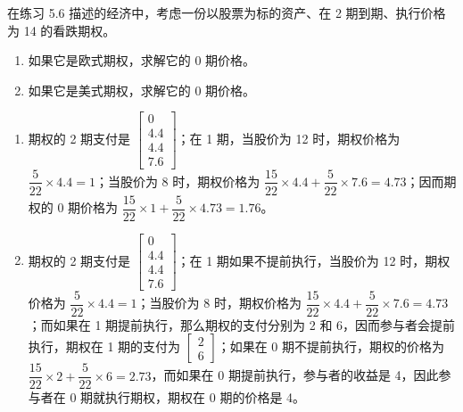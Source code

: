 \begin{problem}
 在练习 5.6 描述的经济中，考虑一份以股票为标的资产、在 2 期到期、执行价格为 14 的看跌期权。
\begin{enumerate}[label=(\alph*)]
    \item 如果它是欧式期权，求解它的 0 期价格。
    \item 如果它是美式期权，求解它的 0 期价格。
\end{enumerate}
\end{problem}
\begin{solution}
\begin{enumerate}[label=(\alph*)]
    \item 期权的 2 期支付是 $\begin{bmatrix}0\\4.4\\4.4\\7.6\end{bmatrix}$；在 1 期，当股价为 12 时，期权价格为 $\dfrac{5}{22}\times 4.4=1$；当股价为 8 时，期权价格为 $\dfrac{15}{22}\times 4.4+\dfrac{5}{22}\times 7.6=4.73$；因而期权的 0 期价格为 $\dfrac{15}{22}\times 1+\dfrac{5}{22}\times 4.73=1.76$。
    \item 期权的 2 期支付是 $\begin{bmatrix}0\\4.4\\4.4\\7.6\end{bmatrix}$；在 1 期如果不提前执行，当股价为 12 时，期权价格为 $\dfrac{5}{22}\times 4.4=1$；当股价为 8 时，期权价格为 $\dfrac{15}{22}\times 4.4+\dfrac{5}{22}\times 7.6=4.73$；而如果在 1 期提前执行，那么期权的支付分别为 2 和 6，因而参与者会提前执行，期权在 1 期的支付为 $\begin{bmatrix}2 \\ 6\end{bmatrix}$；如果在 0 期不提前执行，期权的价格为 $\dfrac{15}{22}\times 2+\dfrac{5}{22}\times 6=2.73$，而如果在 0 期提前执行，参与者的收益是 4，因此参与者在 0 期就执行期权，期权在 0 期的价格是 4。
\end{enumerate}
\end{solution}

